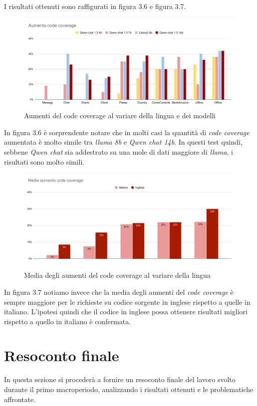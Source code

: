     I risultati ottenuti sono raffigurati in figura 3.6 e figura 3.7.
    \begin{figure}[htp]
        \centering        
        \includegraphics[width=14.5cm]{img/Aumento code coverage.pdf}
        \caption{Aumenti del code coverage al variare della lingua e dei modelli}
    \end{figure}\newline 
    In figura 3.6  è sorprendente notare che in molti casi la quantità di \textit{code coverage} aumentata è molto simile tra \textit{llama 8b} e \textit{Qwen chat 14b}.
    In questi test quindi, sebbene \textit{Qwen chat} sia addestrato su una mole di dati maggiore di \textit{llama}, i risultati sono molto simili.
    \begin{figure}[htp]
        \centering        
        \includegraphics[width=14.5cm]{img/Media aumento code coverage.pdf}
        \caption{Media degli aumenti del code coverage al variare della lingua}
    \end{figure}\newpage
    In figura 3.7 notiamo invece che la media degli aumenti del \textit{code coverage} è sempre maggiore per le richieste su codice sorgente in inglese rispetto a quelle in italiano.
    L'ipotesi quindi che il codice in inglese possa ottenere risultati migliori rispetto a quello in italiano è confermata.
    \newpage
\section{Resoconto finale}
    In questa sezione si procederà a fornire un resoconto finale del lavoro svolto durante il primo macroperiodo, analizzando i risultati ottenuti e le problematiche affrontate.
